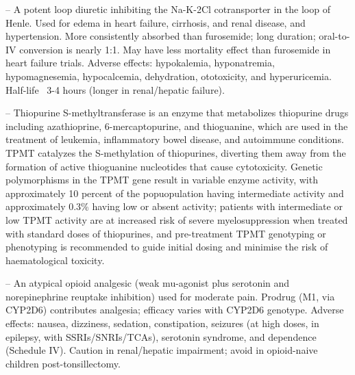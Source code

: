 -- A potent loop diuretic inhibiting the Na-K-2Cl cotransporter in the loop of Henle. Used for edema in heart failure, cirrhosis, and renal disease, and hypertension. More consistently absorbed than furosemide; long duration; oral-to-IV conversion is nearly 1:1. May have less mortality effect than furosemide in heart failure trials. Adverse effects: hypokalemia, hyponatremia, hypomagnesemia, hypocalcemia, dehydration, ototoxicity, and hyperuricemia. Half-life ~3-4 hours (longer in renal/hepatic failure).

-- Thiopurine S-methyltransferase is an enzyme that metabolizes thiopurine drugs including azathioprine, 6-mercaptopurine, and thioguanine, which are used in the treatment of leukemia, inflammatory bowel disease, and autoimmune conditions. TPMT catalyzes the S-methylation of thiopurines, diverting them away from the formation of active thioguanine nucleotides that cause cytotoxicity. Genetic polymorphisms in the TPMT gene result in variable enzyme activity, with approximately 10 percent of the popuopulation having intermediate activity and approximately 0.3\% having low or absent activity; patients with intermediate or low TPMT activity are at increased risk of severe myelosuppression when treated with standard doses of thiopurines, and pre-treatment TPMT genotyping or phenotyping is recommended to guide initial dosing and minimise the risk of haematological toxicity.

-- An atypical opioid analgesic (weak mu-agonist plus serotonin and norepinephrine reuptake inhibition) used for moderate pain. Prodrug (M1, via CYP2D6) contributes analgesia; efficacy varies with CYP2D6 genotype. Adverse effects: nausea, dizziness, sedation, constipation, seizures (at high doses, in epilepsy, with SSRIs/SNRIs/TCAs), serotonin syndrome, and dependence (Schedule IV). Caution in renal/hepatic impairment; avoid in opioid-naive children post-tonsillectomy.

